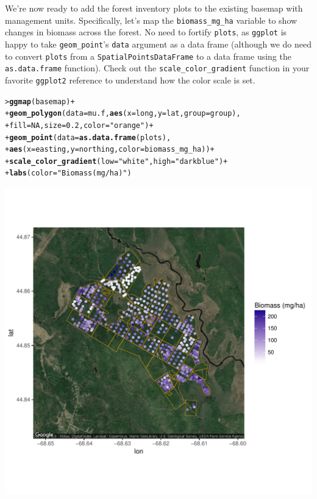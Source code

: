 \documentclass[12pt,oneside]{book}\usepackage[]{graphicx}\usepackage[]{color}
\makeatletter
\def\maxwidth{ %
  \ifdim\Gin@nat@width>\linewidth
    \linewidth
  \else
    \Gin@nat@width
  \fi
}
\newcommand{\hlnum}[1]{\textcolor[rgb]{0.686,0.059,0.569}{#1}}%
\newcommand{\hlstr}[1]{\textcolor[rgb]{0.192,0.494,0.8}{#1}}%
\newcommand{\hlopt}[1]{\textcolor[rgb]{0,0,0}{#1}}%
\newcommand{\hlstd}[1]{\textcolor[rgb]{0.345,0.345,0.345}{#1}}%
\newcommand{\hlkwc}[1]{\textcolor[rgb]{0.333,0.667,0.333}{#1}}%
\newcommand{\hlkwd}[1]{\textcolor[rgb]{0.737,0.353,0.396}{\textbf{#1}}}%
\newenvironment{kframe}{%
 \def\at@end@of@kframe{}%
 \ifinner\ifhmode%
  \def\at@end@of@kframe{\end{minipage}}%
  \begin{minipage}{\columnwidth}%
 \fi\fi%
 \def\FrameCommand##1{\hskip\@totalleftmargin \hskip-\fboxsep
 \colorbox{shadecolor}{##1}\hskip-\fboxsep
     \hskip-\linewidth \hskip-\@totalleftmargin \hskip\columnwidth}%
 \MakeFramed {\advance\hsize-\width
   \@totalleftmargin\z@ \linewidth\hsize
   \@setminipage}}%
 {\par\unskip\endMakeFramed%
 \at@end@of@kframe}
\newenvironment{knitrout}{}{} %
\makeatother
\begin{document}
We're now ready to add the forest inventory plots to the existing basemap with management units. Specifically, let's map the \verb+biomass_mg_ha+ variable to show changes in biomass across the forest. No need to fortify \verb+plots+, as \verb+ggplot+ is happy to take \verb+geom_point+'s \verb+data+ argument as a data frame (although we do need to convert \verb+plots+ from a \verb+SpatialPointsDataFrame+ to a data frame using the \verb+as.data.frame+ function). Check out the \verb+scale_color_gradient+ function in your favorite \verb+ggplot2+ reference to understand how the color scale is set.
\begin{knitrout}
\color{fgcolor}\begin{kframe}
\begin{alltt}
\hlstd{> }\hlkwd{ggmap}\hlstd{(basemap)} \hlopt{+}
\hlstd{+ }    \hlkwd{geom_polygon}\hlstd{(}\hlkwc{data}\hlstd{=mu.f,} \hlkwd{aes}\hlstd{(}\hlkwc{x} \hlstd{= long,} \hlkwc{y} \hlstd{= lat,} \hlkwc{group}\hlstd{=group),}
\hlstd{+ }                 \hlkwc{fill}\hlstd{=}\hlnum{NA}\hlstd{,} \hlkwc{size}\hlstd{=}\hlnum{0.2}\hlstd{,} \hlkwc{color}\hlstd{=}\hlstr{"orange"}\hlstd{)} \hlopt{+}
\hlstd{+ }    \hlkwd{geom_point}\hlstd{(}\hlkwc{data}\hlstd{=}\hlkwd{as.data.frame}\hlstd{(plots),}
\hlstd{+ }               \hlkwd{aes}\hlstd{(}\hlkwc{x} \hlstd{= easting,} \hlkwc{y} \hlstd{= northing,} \hlkwc{color}\hlstd{=biomass_mg_ha))} \hlopt{+}
\hlstd{+ }    \hlkwd{scale_color_gradient}\hlstd{(}\hlkwc{low}\hlstd{=}\hlstr{"white"}\hlstd{,} \hlkwc{high}\hlstd{=}\hlstr{"darkblue"}\hlstd{)} \hlopt{+}
\hlstd{+ }    \hlkwd{labs}\hlstd{(}\hlkwc{color} \hlstd{=} \hlstr{"Biomass (mg/ha)"}\hlstd{)}
\end{alltt}
\end{kframe}
\includegraphics[width=\maxwidth]{figure/unnamed-chunk-192-1} 

\end{knitrout}
\end{document}
